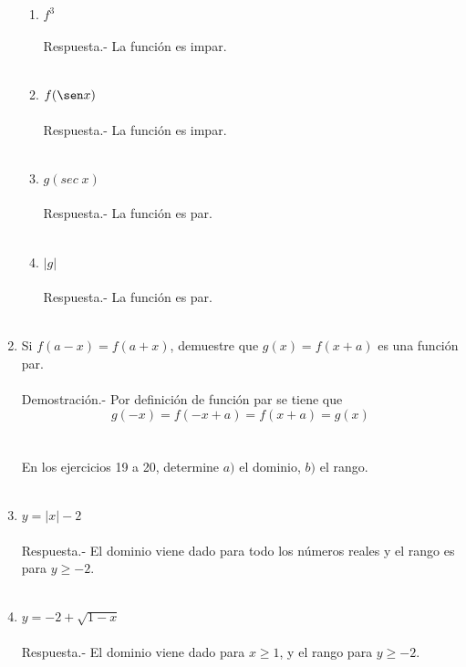 \begin{enumerate}
\begin{enumerate}[\bfseries a)]
    \item $f^3$\\\\
	Respuesta.-\; La función es impar.\\\\

    \item $f(\sen x)$\\\\
	Respuesta.-\; La función es impar.\\\\

    \item $g(sec \; x)$\\\\
	Respuesta.-\; La función es par.\\\\

    \item $|g|$\\\\
	Respuesta.-\; La función es par.\\\\

\end{enumerate}

\item Si $f(a-x) = f(a+x)$, demuestre que $g(x)=f(x+a)$ es una función par.\\\\
    Demostración.-\; Por definición de función par se tiene que 
    $$g(-x) = f(-x+a) = f(x+a) = g(x)$$\\\\

En los ejercicios 19 a 20, determine $a)$ el dominio, $b)$ el rango.\\\\

\item $y=|x|-2$\\\\
    Respuesta.-\; El dominio viene dado para todo los números reales y el rango es para $y\geq -2$.\\\\

\item $y=-2 + \sqrt{1-x}$\\\\
    Respuesta.-\; El dominio viene dado para $x\geq 1$, y el rango para $y\geq -2$.\\\\


\end{enumerate}
